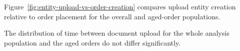 \label{subsec:entity-upload-analysis-upload}
Figure~\ref{fig:entity-upload-vs-order-creation} compares upload entity
creation relative to order placement for the overall and aged-order populations.

The distribution of time between document upload for the whole
analysis population and the aged orders do not differ significantly.

